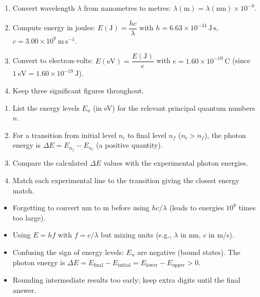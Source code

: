 \documentclass[11pt]{article}
\begin{document}
\begin{methode}
\begin{enumerate}
\item Convert wavelength $\lambda$ from nanometres to metres: $\lambda(\mathrm{m}) = \lambda(\mathrm{nm}) \times 10^{-9}$.
\item Compute energy in joules: $E(\mathrm{J}) = \dfrac{hc}{\lambda}$ with $h = 6.63\times 10^{-34}\ \mathrm{J\,s}$, $c = 3.00\times 10^8\ \mathrm{m\,s^{-1}}$.
\item Convert to electron-volts: $E(\mathrm{eV}) = \dfrac{E(\mathrm{J})}{e}$ with $e = 1.60\times 10^{-19}\ \mathrm{C}$ (since $1\ \mathrm{eV} = 1.60\times 10^{-19}\ \mathrm{J}$).
\item Keep three significant figures throughout.
\end{enumerate}
\end{methode}

\begin{methode}
\begin{enumerate}
\item List the energy levels $E_n$ (in eV) for the relevant principal quantum numbers $n$.
\item For a transition from initial level $n_i$ to final level $n_f$ ($n_i > n_f$), the photon energy is $\Delta E = E_{n_f} - E_{n_i}$ (a positive quantity).
\item Compare the calculated $\Delta E$ values with the experimental photon energies.
\item Match each experimental line to the transition giving the closest energy match.
\end{enumerate}
\end{methode}

\begin{attention}
\begin{itemize}
\item Forgetting to convert nm to m before using $hc/\lambda$ (leads to energies $10^9$ times too large).
\item Using $E = hf$ with $f = c/\lambda$ but mixing units (e.g., $\lambda$ in nm, $c$ in m/s).
\item Confusing the sign of energy levels: $E_n$ are negative (bound states). The photon energy is $\Delta E = E_{\text{final}} - E_{\text{initial}} = E_{\text{lower}} - E_{\text{upper}} > 0$.
\item Rounding intermediate results too early; keep extra digits until the final answer.
\end{itemize}
\end{attention}
\end{document}
